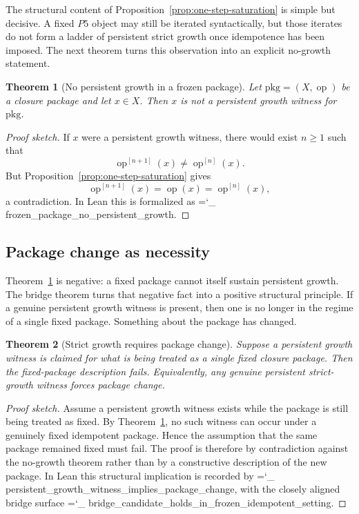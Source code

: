 \documentclass[11pt]{article}
\newtheorem{theorem}{Theorem}
\newcommand{\lid}[1]{{\small\ttfamily\hyphenchar\font=`\_ #1}}
\begin{document}
The structural content of Proposition~\ref{prop:one-step-saturation} is simple but decisive. A fixed \(P5\) object may still be iterated syntactically, but those iterates do not form a ladder of persistent strict growth once idempotence has been imposed. The next theorem turns this observation into an explicit no-growth statement.

\begin{theorem}[No persistent growth in a frozen package]\label{thm:no-persistent-growth}
Let \(\mathrm{pkg}=(X,\operatorname{op})\) be a closure package and let \(x\in X\). Then \(x\) is not a persistent growth witness for \(\mathrm{pkg}\).
\end{theorem}

\begin{proof}[Proof sketch]
If \(x\) were a persistent growth witness, there would exist \(n\ge 1\) such that
\[
\operatorname{op}^{[n+1]}(x)\neq \operatorname{op}^{[n]}(x).
\]
But Proposition~\ref{prop:one-step-saturation} gives
\[
\operatorname{op}^{[n+1]}(x)=\operatorname{op}(x)=\operatorname{op}^{[n]}(x),
\]
a contradiction. In Lean this is formalized as \lid{frozen\_package\_no\_persistent\_growth}.
\end{proof}

\subsection*{Package change as necessity}

Theorem~\ref{thm:no-persistent-growth} is negative: a fixed package cannot itself sustain persistent growth. The bridge theorem turns that negative fact into a positive structural principle. If a genuine persistent growth witness is present, then one is no longer in the regime of a single fixed package. Something about the package has changed.

\begin{theorem}[Strict growth requires package change]\label{thm:package-change-necessity}
Suppose a persistent growth witness is claimed for what is being treated as a single fixed closure package. Then the fixed-package description fails. Equivalently, any genuine persistent strict-growth witness forces package change.
\end{theorem}

\begin{proof}[Proof sketch]
Assume a persistent growth witness exists while the package is still being treated as fixed. By Theorem~\ref{thm:no-persistent-growth}, no such witness can occur under a genuinely fixed idempotent package. Hence the assumption that the same package remained fixed must fail. The proof is therefore by contradiction against the no-growth theorem rather than by a constructive description of the new package. In Lean this structural implication is recorded by \lid{persistent\_growth\_witness\_implies\_package\_change}, with the closely aligned bridge surface \lid{bridge\_candidate\_holds\_in\_frozen\_idempotent\_setting}.
\end{proof}
\end{document}
